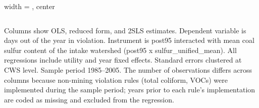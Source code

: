 \begin{table}[htbp]
\begin{adjustbox}{width = \textwidth, center}
\begin{tabular}{lrrrrrr}
         \bottomrule
         
      \end{tabular}
      
      
      
   \end{adjustbox}
      {\tiny\linespread{1}\selectfont \par \raggedright 
   Columns show OLS, reduced form, and 2SLS estimates. Dependent variable is days out of the year in violation. Instrument is post95 interacted with mean coal sulfur content of the intake watershed (post95 x sulfur\_unified\_mean). All regressions include utility and year fixed effects. Standard errors clustered at CWS level. Sample period 1985--2005. The number of observations differs across columns because non-mining violation rules (total coliform, VOCs) were implemented during the sample period; years prior to each rule's implementation are coded as missing and excluded from the regression.}
   
\end{table}


